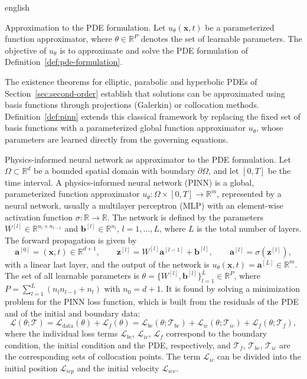 \documentclass[12pt,letterpaper,twoside]{book}
\newcommand{\Loss}{\mathcal{L}}
\newcommand{\T}{\mathcal{T}}
\begin{document}
\begin{hyphenrules}{english}
\begin{definicion}{Approximation to the PDE formulation.}\label{def:pde-approx}
Let $u_\theta(\mathbf{x},t)$ be a parameterized function approximator, where $\theta\in\mathbb{R}^P$ denotes the set of
learnable parameters. The objective of $u_\theta$ is to approximate and solve the PDE formulation of
Definition~\ref{def:pde-formulation}.
\end{definicion}

The existence theorems for elliptic, parabolic and hyperbolic PDEs of Section~\ref{sec:second-order} establish
that solutions can be approximated using basis functions through projections (Galerkin) or collocation
methods. Definition~\ref{def:pinn} extends this classical framework by replacing the fixed set of basis functions
with a parameterized global function approximator $u_\theta$, whose parameters are learned directly from
the governing equations.

\begin{definicion}{Physics-informed neural network as approximator to the PDE formulation.}\label{def:pinn}
Let $\Omega\subset\mathbb{R}^d$ be a bounded spatial domain with boundary $\partial\Omega$, and let $[0,T]$ be
the time interval. A physics-informed neural network (PINN) is a global, parameterized function
approximator $u_\theta:\Omega\times[0,T]\to\mathbb{R}^{m}$, represented by a neural network, usually a
multilayer perceptron (MLP) with an element-wise activation function $\sigma:\mathbb{R}\to\mathbb{R}$. The network is
defined by the parameters $W^{[l]}\in\mathbb{R}^{n_l\times n_{l-1}}$ and $\mathbf{b}^{[l]}\in\mathbb{R}^{n_l}$,
$l=1,\dots,L$, where $L$ is the total number of layers. The forward propagation is given by
\cite{goodfellow2016}
\[
  \mathbf{a}^{[0]}=(\mathbf{x},t)\in\mathbb{R}^{d+1},\qquad
  \mathbf{z}^{[l]}=W^{[l]}\mathbf{a}^{[l-1]}+\mathbf{b}^{[l]},\qquad
  \mathbf{a}^{[l]}=\sigma(\mathbf{z}^{[l]}),
\]
with a linear last layer, and the output of the network is $u_\theta(\mathbf{x},t)=\mathbf{a}^{[L]}\in\mathbb{R}^m$. The
set of all learnable parameters is $\theta=\{W^{[l]},\mathbf{b}^{[l]}\}_{l=1}^{L}\in\mathbb{R}^{P}$, where
$P=\sum_{l=1}^{L}(n_ln_{l-1}+n_l)$ with $n_0=d+1$. It is found by solving a minimization problem for the
PINN loss function, which is built from the residuals of the PDE and of the initial and boundary data:
\[
  \Loss(\theta;\T)=\Loss_{\mathrm{data}}(\theta)+\Loss_f(\theta)
  =\Loss_{bc}(\theta;\T_{bc})+\Loss_{ic}(\theta;\T_{ic})+\Loss_f(\theta;\T_f),
\]
where the individual loss terms $\Loss_{bc}$, $\Loss_{ic}$, $\Loss_f$ correspond to the boundary
condition, the initial condition and the PDE, respectively, and $\T_f$, $\T_{bc}$, $\T_{ic}$ are the
corresponding sets of collocation points. The term $\Loss_{ic}$ can be divided into the initial
position $\Loss_{icp}$ and the initial velocity $\Loss_{icv}$.
\end{definicion}


\end{hyphenrules}
\end{document}
